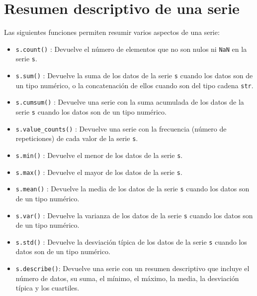 \documentclass[
  spanish,
  a4paper,
]{scrreport}
\providecommand{\tightlist}{%
  \setlength{\itemsep}{0pt}\setlength{\parskip}{0pt}}
\begin{document}
\section{Resumen descriptivo de una
serie}\label{resumen-descriptivo-de-una-serie}

Las siguientes funciones permiten resumir varios aspectos de una serie:

\begin{itemize}
\tightlist
\item
  \texttt{s.count()} : Devuelve el número de elementos que no son nulos
  ni \texttt{NaN} en la serie \texttt{s}.
\item
  \texttt{s.sum()} : Devuelve la suma de los datos de la serie
  \texttt{s} cuando los datos son de un tipo numérico, o la
  concatenación de ellos cuando son del tipo cadena \texttt{str}.
\item
  \texttt{s.cumsum()} : Devuelve una serie con la suma acumulada de los
  datos de la serie \texttt{s} cuando los datos son de un tipo numérico.
\item
  \texttt{s.value\_counts()} : Devuelve una serie con la frecuencia
  (número de repeticiones) de cada valor de la serie \texttt{s}.
\item
  \texttt{s.min()} : Devuelve el menor de los datos de la serie
  \texttt{s}.
\item
  \texttt{s.max()} : Devuelve el mayor de los datos de la serie
  \texttt{s}.
\item
  \texttt{s.mean()} : Devuelve la media de los datos de la serie
  \texttt{s} cuando los datos son de un tipo numérico.
\item
  \texttt{s.var()} : Devuelve la varianza de los datos de la serie
  \texttt{s} cuando los datos son de un tipo numérico.
\item
  \texttt{s.std()} : Devuelve la desviación típica de los datos de la
  serie \texttt{s} cuando los datos son de un tipo numérico.
\item
  \texttt{s.describe()}: Devuelve una serie con un resumen descriptivo
  que incluye el número de datos, su suma, el mínimo, el máximo, la
  media, la desviación típica y los cuartiles.
\end{itemize}
\end{document}
